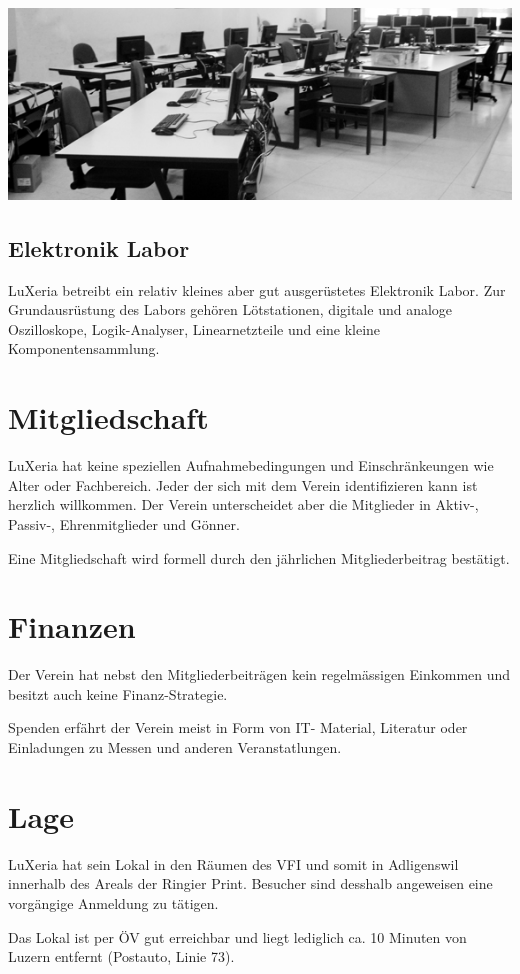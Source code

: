 \documentclass[10pt,foldmark,notumble]{leaflet}
\begin{document}
\includegraphics[width=1\textwidth]{kursraum.jpg}

\subsection{Elektronik Labor}
LuXeria betreibt ein relativ kleines aber gut
ausgerüstetes Elektronik Labor. Zur Grundausrüstung 
des Labors gehören Lötstationen, digitale und analoge
Oszilloskope, Logik-Analyser, Linearnetzteile und eine
kleine Komponentensammlung.

\section{Mitgliedschaft}
LuXeria hat keine speziellen Aufnahmebedingungen und 
Einschränkeungen wie Alter oder Fachbereich. Jeder der
sich mit dem Verein identifizieren kann ist herzlich 
willkommen. Der Verein unterscheidet aber die Mitglieder
in Aktiv-, Passiv-, Ehrenmitglieder und Gönner.

Eine Mitgliedschaft wird formell durch den jährlichen 
Mitgliederbeitrag bestätigt. 

\section{Finanzen}
Der Verein hat nebst den Mitgliederbeiträgen kein
regelmässigen Einkommen und besitzt auch keine
Finanz-Strategie. 

Spenden erfährt der Verein meist in Form von IT-
Material, Literatur oder Einladungen zu Messen
und anderen Veranstatlungen.

\section{Lage}
LuXeria hat sein Lokal in den Räumen des VFI 
und somit in Adligenswil innerhalb des Areals 
der Ringier Print. Besucher sind desshalb angeweisen
eine vorgängige Anmeldung zu tätigen. 

Das Lokal ist per ÖV gut erreichbar und liegt lediglich 
ca. 10 Minuten von Luzern entfernt (Postauto, Linie 73).
\end{document}

